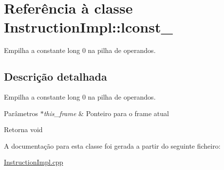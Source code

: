 \hypertarget{class_instruction_impl_1_1lconst__0}{}\section{Referência à classe Instruction\+Impl\+:\+:lconst\+\_}
\label{class_instruction_impl_1_1lconst__0}


Empilha a constante long 0 na pilha de operandos.  




\subsection{Descrição detalhada}
Empilha a constante long 0 na pilha de operandos. 


\begin{DoxyParams}{Parâmetros}
{\em $\ast$this\+\_\+frame} & Ponteiro para o frame atual \\
\hline
\end{DoxyParams}
\begin{DoxyReturn}{Retorna}
void 
\end{DoxyReturn}


A documentação para esta classe foi gerada a partir do seguinte ficheiro\+:\begin{DoxyCompactItemize}
\item 
\hyperlink{_instruction_impl_8cpp}{Instruction\+Impl.\+cpp}\end{DoxyCompactItemize}
